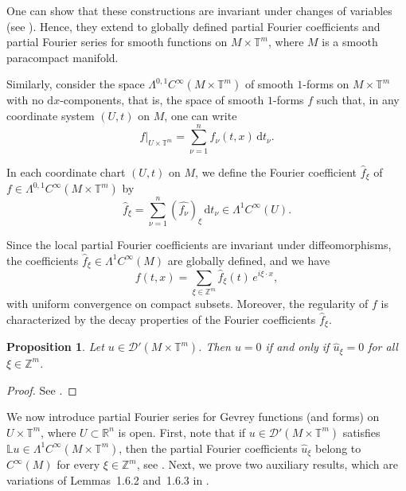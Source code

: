 \documentclass[11pt,reqno]{amsart}
\numberwithin{equation}{section}
\newtheorem{proposition}[theorem]{Proposition}
\begin{document}
	One can show that these constructions are invariant under changes of variables (see \cite{ADL2023gh}).
	Hence, they extend to globally defined partial Fourier coefficients and partial Fourier series for smooth functions on \(M\times\mathbb{T}^m\), where \(M\) is a smooth paracompact manifold.
	
	Similarly, consider the space \(\mathsf{\Lambda}^{0,1} C^\infty(M \times \mathbb{T}^m)\) of smooth \(1\)-forms on \(M \times \mathbb{T}^m\) with no \(\mathrm{d}x\)-components, that is, the space of smooth \(1\)-forms \(f\) such that, in any coordinate system \((U,t)\) on \(M\), one can write
	\[
	f|_{U \times \mathbb{T}^m} = \sum_{\nu=1}^n f_\nu(t, x) \, \mathrm{d}t_\nu.
	\]
	
	In each coordinate chart \((U,t)\) on \(M\), we define the Fourier coefficient \(\widehat{f}_\xi\) of
	\(f \in \mathsf{\Lambda}^{0,1} C^\infty(M \times \mathbb{T}^m)\) by
	\[
	\widehat{f}_\xi = \sum_{\nu=1}^n (\widehat{f_\nu})_\xi \, \mathrm{d}t_\nu \in \mathsf{\Lambda}^1 C^\infty(U).
	\]
	
	Since the local partial Fourier coefficients are invariant under diffeomorphisms, the coefficients
	\(\widehat{f}_\xi\in\mathsf{\Lambda}^{1}C^\infty(M)\) are globally defined, and we have
	\[
	f(t,x) = \sum_{\xi \in \mathbb{Z}^m} \widehat{f}_\xi(t)\, e^{i \xi \cdot x},
	\]
	with uniform convergence on compact subsets. Moreover, the regularity of \(f\) is characterized by the decay properties of the Fourier coefficients \(\widehat{f}_\xi\).
	
	\begin{proposition}\label{lemma_uxieq0}
		Let \(u \in \mathscr{D}'(M \times \mathbb{T}^m)\). Then \(u = 0\) if and only if \(\widehat{u}_\xi = 0\) for all \(\xi \in \mathbb{Z}^m\).
	\end{proposition}
	\begin{proof}
		See \cite[Lemma 5.1]{ADL2023gh}.
	\end{proof}
	
	We now introduce partial Fourier series for Gevrey functions (and forms) on \(U\times\mathbb{T}^m\), where \(U\subset\mathbb{R}^n\) is open.
	First, note that if \(u\in\mathscr{D}'(M\times\mathbb{T}^m)\) satisfies
	\(\mathbb{L}u\in\mathsf{\Lambda}^1C^\infty(M\times\mathbb{T}^m)\), then the partial Fourier coefficients \(\widehat{u}_\xi\) belong to \(C^\infty(M)\) for every \(\xi\in\mathbb{Z}^m\), see \cite[Corollay 2.4]{CKMT}.
	Next, we prove two auxiliary results, which are variations of Lemmas~1.6.2 and~1.6.3 in \cite{Rod_Gevrey}.
	
\end{document}
